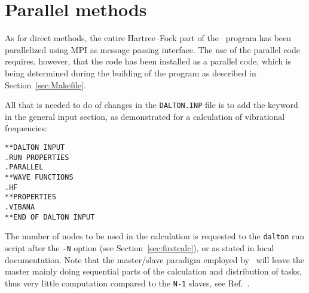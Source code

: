 \section{Parallel methods}\label{sec:parallel}

\begin{center}
\end{center}

As for direct methods, the entire Hartree--Fock part of the \dalton\
program has been parallelized using MPI as
message passing interface. The use of the parallel code requires,
however, that the code has been installed as a parallel
code, which is
being determined during the building of the program as described in
Section~\ref{sec:Makefile}.

All that is needed to do
of changes in the \verb|DALTON.INP| file is to add the keyword
 in the general input section, as demonstrated for a
calculation of vibrational frequencies\index{vibrational frequency}:

\begin{verbatim}
**DALTON INPUT
.RUN PROPERTIES
.PARALLEL
**WAVE FUNCTIONS
.HF
**PROPERTIES
.VIBANA
**END OF DALTON INPUT
\end{verbatim}

The number of nodes to be used in the calculation is
requested to the 
\verb|dalton| run script after the \verb|-N| option (see
Section~\ref{sec:firstcalc}), or as stated in local
documentation. Note that the master/slave
paradigm employed by 
\dalton\ will leave the master mainly doing sequential parts of the
calculation and distribution of tasks, thus very little computation
compared to the \verb|N-1| slaves, see
Ref.~\cite{pndjhapdkrthhkcpl253}.

%

